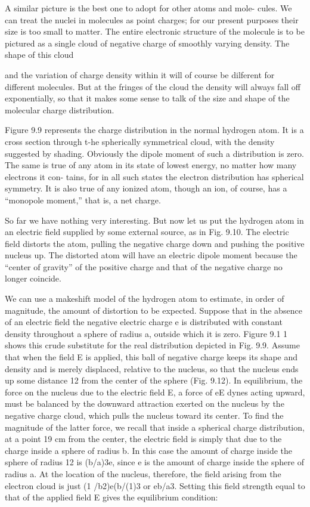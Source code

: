 {A similar picture is the best one to adopt for other atoms and mole-
cules. We can treat the nuclei in molecules as point charges; for our
present purposes their size is too small to matter. The entire electronic
structure of the molecule is to be pictured as a single cloud of
negative charge of smoothly varying density. The shape of this cloud

and the variation of charge density within it will of course be dilferent
for different molecules. But at the fringes of the cloud the density
will always fall off exponentially, so that it makes some sense to talk
of the size and shape of the molecular charge distribution.

Figure 9.9 represents the charge distribution in the normal hydrogen
atom. It is a cross section through t-he spherically symmetrical
cloud, with the density suggested by shading. Obviously the dipole
moment of such a distribution is zero. The same is true of any atom
in its state of lowest energy, no matter how many electrons it con-
tains, for in all such states the electron distribution has spherical
symmetry. It is also true of any ionized atom, though an ion, of
course, has a ``monopole moment,'' that is, a net charge.

So far we have nothing very interesting. But now let us put the
hydrogen atom in an electric field supplied by some external source,
as in Fig. 9.10. The electric field distorts the atom, pulling the negative
charge down and pushing the positive nucleus up. The distorted
atom will have an electric dipole moment because the ``center of
gravity'' of the positive charge and that of the negative charge no
longer coincide.

We can use a makeshift model of the hydrogen atom to estimate,
in order of magnitude, the amount of distortion to be expected.
Suppose that in the absence of an electric field the negative electric
charge e is distributed with constant density throughout a sphere of
radius a, outside which it is zero. Figure 9.1 1 shows this crude substitute
for the real distribution depicted in Fig. 9.9. Assume that
when the field E is applied, this ball of negative charge keeps its shape
and density and is merely displaced, relative to the nucleus, so that
the nucleus ends up some distance 12 from the center of the sphere
(Fig. 9.12). In equilibrium, the force on the nucleus due to the electric
field E, a force of eE dynes acting upward, must be balanced by
the downward attraction exerted on the nucleus by the negative
charge cloud, which pulls the nucleus toward its center. To find the
magnitude of the latter force, we recall that inside a spherical charge
distribution, at a point 19 cm from the center, the electric field is
simply that due to the charge inside a sphere of radius b. In this case
the amount of charge inside the sphere of radius 12 is (b/a)3e, since e
is the amount of charge inside the sphere of radius a. At the location
of the nucleus, therefore, the field arising from the electron cloud is
just (1 /b2)e(b/(1)3 or eb/a3. Setting this field strength equal to that
of the applied field E gives the equilibrium condition:

}
